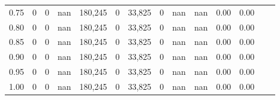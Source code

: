 \begin{tabular}{rrrrrrrrrrrrrr}
0.75 &       0 &      0 &     nan &  180,245 &        0 &  33,825 &       0 &   nan &   nan &  0.00 &      0.00 \\
0.80 &       0 &      0 &     nan &  180,245 &        0 &  33,825 &       0 &   nan &   nan &  0.00 &      0.00 \\
0.85 &       0 &      0 &     nan &  180,245 &        0 &  33,825 &       0 &   nan &   nan &  0.00 &      0.00 \\
0.90 &       0 &      0 &     nan &  180,245 &        0 &  33,825 &       0 &   nan &   nan &  0.00 &      0.00 \\
0.95 &       0 &      0 &     nan &  180,245 &        0 &  33,825 &       0 &   nan &   nan &  0.00 &      0.00 \\
1.00 &       0 &      0 &     nan &  180,245 &        0 &  33,825 &       0 &   nan &   nan &  0.00 &      0.00 \\
\bottomrule
\end{tabular}
